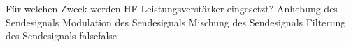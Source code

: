    {Für welchen Zweck werden HF-Leistungsverstärker eingesetzt?}
    {Anhebung des Sendesignals}
    {Modulation des Sendesignals}
    {Mischung des Sendesignals}
    {Filterung des Sendesignals}
    {false}{false}